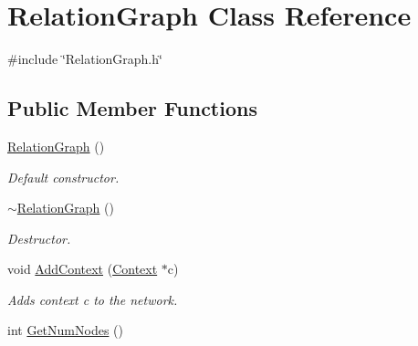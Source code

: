 \hypertarget{class_relation_graph}{
\section{RelationGraph Class Reference}
\label{class_relation_graph}
}


{\ttfamily \#include \char`\"{}RelationGraph.h\char`\"{}}

\subsection*{Public Member Functions}
\begin{DoxyCompactItemize}
\item 
\hypertarget{class_relation_graph_a6bac261190e85c0fa8cce617184ea6a0}{
\hyperlink{class_relation_graph_a6bac261190e85c0fa8cce617184ea6a0}{RelationGraph} ()}
\label{class_relation_graph_a6bac261190e85c0fa8cce617184ea6a0}

\begin{DoxyCompactList}\small\item\em Default constructor. \item\end{DoxyCompactList}\item 
\hypertarget{class_relation_graph_a801766615e87cb42f511cb068dd9d482}{
\hyperlink{class_relation_graph_a801766615e87cb42f511cb068dd9d482}{$\sim$RelationGraph} ()}
\label{class_relation_graph_a801766615e87cb42f511cb068dd9d482}

\begin{DoxyCompactList}\small\item\em Destructor. \item\end{DoxyCompactList}\item 
void \hyperlink{class_relation_graph_a5c1bd71649ec9c19f28b3fe0abda9540}{AddContext} (\hyperlink{class_context}{Context} $\ast$c)
\begin{DoxyCompactList}\small\item\em Adds context c to the network. \item\end{DoxyCompactList}\item 
\hypertarget{class_relation_graph_adeb2d25e6c30b397daec5179473ba122}{
int \hyperlink{class_relation_graph_adeb2d25e6c30b397daec5179473ba122}{GetNumNodes} ()}
\label{class_relation_graph_adeb2d25e6c30b397daec5179473ba122}


\end{DoxyCompactItemize}
